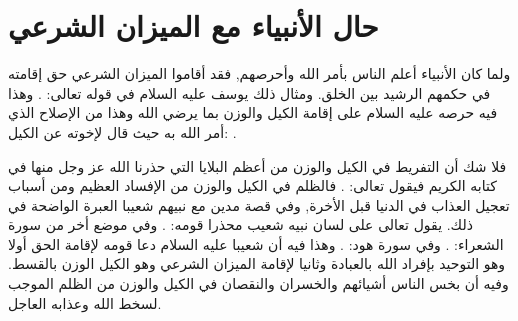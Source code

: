 \section{حال الأنبياء مع الميزان الشرعي}

ولما كان الأنبياء أعلم الناس بأمر الله وأحرصهم, فقد أقاموا الميزان الشرعي حق إقامته في حكمهم الرشيد بين الخلق. ومثال ذلك يوسف عليه السلام في قوله تعالى:
\quranayah*[12][55]{\footnotesize \surahname*[12]}.
وهذا فيه حرصه عليه السلام على إقامة الكيل والوزن بما يرضي الله وهذا من الإصلاح الذي أمر الله به حيث قال لإخوته عن الكيل:
\quranayah*[12][59-60]{\footnotesize \surahname*[12]}.

فلا شك أن التفريط في الكيل والوزن من أعظم البلايا التي حذرنا الله عز وجل منها في كتابه الكريم فيقول تعالى:
\quranayah*[83][1-6]{\footnotesize \surahname*[83]}. فالظلم في الكيل والوزن من الإفساد العظيم ومن أسباب تعجيل العذاب في الدنيا قبل الأخرة, وفي قصة مدين مع نبيهم شعيبا العبرة الواضحة في ذلك. يقول تعالى على لسان نبيه شعيب محذرا قومه:
\quranayah*[7][85]{\footnotesize \surahname*[7]}.
وفي موضع أخر من سورة الشعراء:
\quranayah*[26][181-183]{\footnotesize \surahname*[26]}.
وفي سورة هود:
\quranayah*[11][84-85]{\footnotesize \surahname*[11]}. وهذا فيه أن شعيبا عليه السلام دعا قومه لإقامة الحق أولا وهو التوحيد بإفراد الله بالعبادة وثانيا لإقامة الميزان الشرعي وهو الكيل الوزن بالقسط. وفيه أن بخس الناس أشيائهم والخسران والنقصان في الكيل والوزن من الظلم الموجب لسخط الله وعذابه العاجل.


